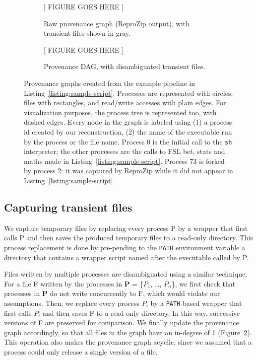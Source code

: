 \documentclass[a4paper,num-refs]{oup-contemporary}
\newcommand{\reprozip}[0]{ReproZip\xspace}
\begin{document}
\begin{figure}
\begin{subfigure}{0.4\linewidth}
  [ FIGURE GOES HERE ]

  \caption{Raw provenance graph (\reprozip output), with transient files shown in gray.}
  \label{fig:provenance-graph}
\end{subfigure}
\hfill
\begin{subfigure}{0.4\linewidth}
  [ FIGURE GOES HERE ]

  \caption{Provenance DAG, with disambiguated transient files.}
  \label{fig:provenance-dag}
\end{subfigure}
  \caption{Provenance graphs
  created from the example pipeline in
  Listing~\ref{listing:sample-script}.
  Processes are represented with circles, files with rectangles, and read/write accesses 
  with plain edges. 
  For visualization purposes, the process tree is represented too, with
  dashed edges. Every node in the graph is labeled using (1) a process id
  created by our reconstruction, (2) the name of the executable run by the
  process or the file name. Process 0 is the initial call to the
  \texttt{sh} interpreter; the other processes are the calls to FSL bet,
  stats and maths made in Listing~\ref{listing:sample-script}. Process 73
  is forked by process 2: it was captured by \reprozip while it did not
  appear in Listing~\ref{listing:sample-script}.
}
  \label{fig:simple_script}
\end{figure}

\subsection{Capturing transient files}

We capture temporary files by replacing every
process P by a wrapper that first calls P and then saves the produced
temporary files to a read-only directory. This process replacement is done by pre-pending
 to the \texttt{PATH} environment
variable a directory that contains a wrapper script named after the executable
called by P.

Files written by multiple processes are disambiguated using a similar technique. For a
 file F written by the processes in \textbf{P} = \{$P_{1}$, \ldots,
 $P_{n}$\}, we first check that processes in \textbf{P} do not
 write concurrently to F, which would violate our assumptions. Then, we
 replace every process $P_{i}$ by a \texttt{PATH}-based wrapper that first
 calls $P_{i}$ and then saves F to a read-only directory. In this way,
 successive versions of F are preserved for comparison. We finally
 update the provenance graph accordingly, so that all files in the graph
 have an in-degree of 1 (Figure~\ref{fig:provenance-dag}). This operation also makes the provenance graph
 acyclic, since we assumed that a process could only release a single version of a file.
\end{document}
